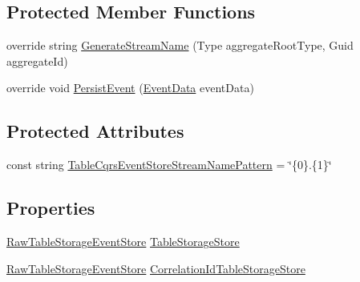 \subsection*{Protected Member Functions}
\begin{DoxyCompactItemize}
\item 
override string \hyperlink{classCqrs_1_1Azure_1_1BlobStorage_1_1Events_1_1TableStorageEventStore_a5cee1f388c1a03d9cfea5ee1a9f42657_a5cee1f388c1a03d9cfea5ee1a9f42657}{Generate\+Stream\+Name} (Type aggregate\+Root\+Type, Guid aggregate\+Id)
\item 
override void \hyperlink{classCqrs_1_1Azure_1_1BlobStorage_1_1Events_1_1TableStorageEventStore_ae63921d0ace265b1b269c865080b5712_ae63921d0ace265b1b269c865080b5712}{Persist\+Event} (\hyperlink{classCqrs_1_1Events_1_1EventData}{Event\+Data} event\+Data)
\end{DoxyCompactItemize}
\subsection*{Protected Attributes}
\begin{DoxyCompactItemize}
\item 
const string \hyperlink{classCqrs_1_1Azure_1_1BlobStorage_1_1Events_1_1TableStorageEventStore_a6e64df5250bd136250259e0a573097e4_a6e64df5250bd136250259e0a573097e4}{Table\+Cqrs\+Event\+Store\+Stream\+Name\+Pattern} = \char`\"{}\{0\}.\{1\}\char`\"{}
\end{DoxyCompactItemize}
\subsection*{Properties}
\begin{DoxyCompactItemize}
\item 
\hyperlink{classCqrs_1_1Azure_1_1BlobStorage_1_1Events_1_1TableStorageEventStore_1_1RawTableStorageEventStore}{Raw\+Table\+Storage\+Event\+Store} \hyperlink{classCqrs_1_1Azure_1_1BlobStorage_1_1Events_1_1TableStorageEventStore_ad86c24c28321c16b1f3601b3e7d870c4_ad86c24c28321c16b1f3601b3e7d870c4}{Table\+Storage\+Store}
\item 
\hyperlink{classCqrs_1_1Azure_1_1BlobStorage_1_1Events_1_1TableStorageEventStore_1_1RawTableStorageEventStore}{Raw\+Table\+Storage\+Event\+Store} \hyperlink{classCqrs_1_1Azure_1_1BlobStorage_1_1Events_1_1TableStorageEventStore_a06b6a3a1ac68dfce2d27aacadffa5beb_a06b6a3a1ac68dfce2d27aacadffa5beb}{Correlation\+Id\+Table\+Storage\+Store}
\end{DoxyCompactItemize}


